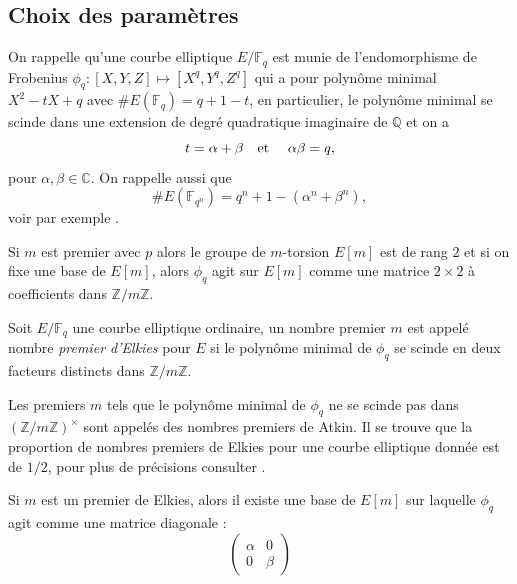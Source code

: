 \documentclass[a4paper]{article} %
\numberwithin{section}{part}
\numberwithin{equation}{section}
\newcommand\zmodn[1]{\mathbb{Z}/#1\mathbb{Z}}
\newcommand\zmodninv[1]{(\mathbb{Z}/#1\mathbb{Z})^{\times}}
\newcommand\GF[1]{\mathbb{F}_{#1}}
\newcommand\QQ{\mathbb{Q}}
\newcommand\CC{\mathbb{C}}
\newcommand\etmath{\textup{\quad et \quad}}
\begin{document}
\subsection{Choix des paramètres}
\label{sec:choixparam}
On rappelle qu'une courbe elliptique $E/\GF{q}$ est munie de l'endomorphisme de
Frobenius $\phi_q : [X, Y, Z] \mapsto [X^q, Y^q, Z^q]$ qui a pour polynôme
minimal $X^2 -tX + q$ avec $\#E(\GF{q}) = q + 1 - t$, en particulier, le
polynôme minimal se scinde dans une extension de degré quadratique imaginaire de
$\QQ$ et on a 
\begin{equation}
t = \alpha + \beta\etmath \alpha\beta = q, 
\end{equation}
pour $\alpha,\beta\in\CC$. On rappelle aussi que 
\begin{equation}
\#E(\GF{q^n}) = q^n + 1 - (\alpha^n + \beta^n), 
\end{equation}
voir par exemple \cite[th. 2.3.1, chap V]{Sil}.\par
Si $m$ est premier avec $p$ alors le groupe de $m$-torsion $E[m]$ est de rang
$2$ et si on fixe une base de $E[m]$, alors $\phi_q$ agit sur $E[m]$ comme une 
matrice $2\times2$ à coefficients dans $\zmodn{m}$.
\begin{defn}
Soit $E/\GF{q}$ une courbe elliptique ordinaire, un nombre premier $m$ est 
appelé nombre \emph{premier d'Elkies} pour $E$ si le polynôme minimal de 
$\phi_q$ se scinde en deux facteurs distincts dans $\zmodn{m}$.
\end{defn}
\begin{rem}
Les premiers $m$ tels que le polynôme minimal de $\phi_q$ ne se scinde pas
dans $\zmodninv{m}$ sont appelés des nombres premiers de Atkin. Il se trouve que
la proportion de nombres premiers de Elkies pour une courbe elliptique donnée 
est de $1/2$, pour plus de précisions consulter \cite{Scho}.
\end{rem}
Si $m$ est un premier de Elkies, alors il existe une base de $E[m]$ sur 
laquelle $\phi_q$ agit comme une matrice diagonale :
\begin{equation}
\begin{pmatrix}
\alpha & 0\\
0 & \beta
\end{pmatrix}
\end{equation}
\end{document}
